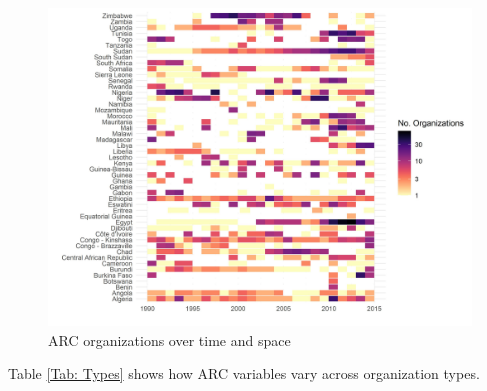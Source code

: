 \begin{figure}[!htbp]
    \centering
    \includegraphics[width = 1\textwidth]{img/figure_2_revised.jpg}
    \caption{ARC organizations over time and space}
    \label{fig:dotplot}
\end{figure}{}


Table \ref{Tab: Types} shows how ARC variables vary across organization types. 

